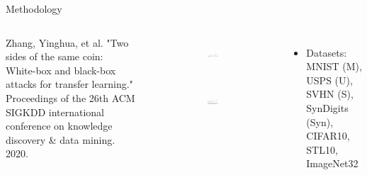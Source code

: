 \begin{frame}{Methodology}

\begin{columns}

 \footnotesize
    \begin{thebibliography}{99}
         Zhang, Yinghua, et al. "Two sides of the same coin: White-box and black-box attacks for transfer learning." Proceedings of the 26th ACM SIGKDD international conference on knowledge discovery \& data mining. 2020.

    \end{thebibliography}

    \begin{figure}
        \begin{subfigure}{0.9\textwidth}
            \centering
            \includegraphics[scale=0.55]{img/exper-1.png}
     
            \label{fig:sub-figure-url-1}
        \end{subfigure} \\
        \begin{subfigure}{0.9\textwidth}
            \centering
            \includegraphics[scale=0.55]{img/exper-2.png}
    
            \label{fig:sub-figure-url-2}
        \end{subfigure}
        \label{fig:example-subfigure}
    \end{figure}
    \begin{itemize}
        \item Datasets: MNIST (M), USPS (U), SVHN (S), SynDigits (Syn), CIFAR10, STL10, ImageNet32
    \end{itemize}
\end{columns}

\end{frame}

